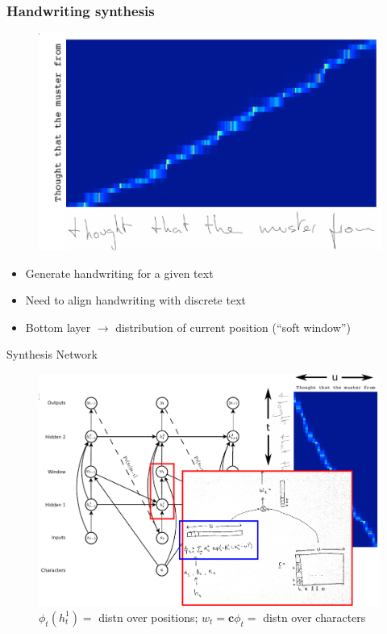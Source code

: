 \documentclass[10pt,xcolor=dvipsnames]{beamer}
\begin{document}
\begin{frame}
  \frametitle{Handwriting synthesis}
  \begin{figure}
    \centering
    \includegraphics[width=.75\linewidth]{fig/fig13.png} 
  \end{figure}
  \begin{itemize}
  \item Generate handwriting for a given text
  \item Need to align handwriting with discrete text
  \item Bottom layer $\to$ distribution of current position
    (``soft window'')
  \end{itemize}
\end{frame}

\begin{frame}{Synthesis Network}
  \begin{figure}
    \centering
  \includegraphics[width=.9\linewidth]{fig/synthesis_network3.png}
    \caption{$\phi_t(h_t^1) = $ distn over positions; $w_t = \mathbf{c}
      \phi_t =$ distn over characters}
    \label{fig:synthesis-network}
  \end{figure}
\end{frame}
\end{document}
